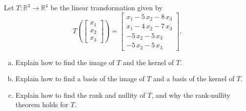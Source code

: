 
\begin{exerciseStatement}
 Let \(T:\mathbb{R}^ 3  \to \mathbb{R}^ 4 \) be the linear transformation given by \[T\left(  \left[\begin{array}{c}
x_{1} \\
x_{2} \\
x_{3}
\end{array}\right]  \right) =  \left[\begin{array}{c}
x_{1} - 5 \, x_{2} - 8 \, x_{3} \\
x_{1} - 4 \, x_{2} - 7 \, x_{3} \\
-5 \, x_{2} - 5 \, x_{3} \\
-5 \, x_{2} - 5 \, x_{3}
\end{array}\right] .\]
\begin{enumerate}[(a)]
\item Explain how to find the image of \(T\) and the kernel of \(T\).
\item Explain how to find a basis of the image of \(T\) and a basis of the kernel of \(T\).
\item Explain how to find the rank and nullity of \(T\), and why the rank-nullity theorem holds for \(T\).
\end{enumerate}
    
\end{exerciseStatement}
    

